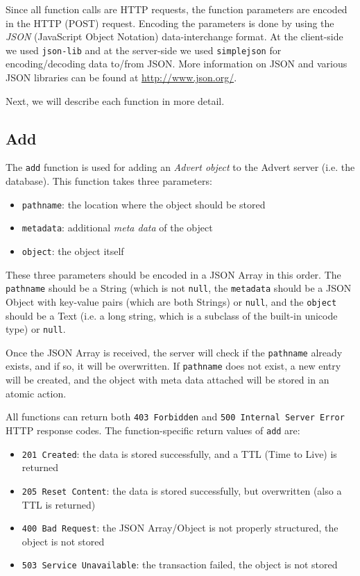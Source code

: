 \documentclass[a4paper,10pt]{article}
\begin{document}
Since all function calls are HTTP requests, the function parameters are encoded
in the HTTP (POST) request. Encoding the parameters is done by using the
\emph{JSON} (JavaScript Object Notation) data-interchange format. At the
client-side we used \texttt{json-lib} and at the server-side we used
\texttt{simplejson} for encoding/decoding data to/from JSON. More information
on JSON and various JSON libraries can be found at \url{http://www.json.org/}.

Next, we will describe each function in more detail.

\subsection{Add}
\label{add}
The \texttt{add} function is used for adding an \emph{Advert object} to the
Advert server (i.e. the database). This function takes three parameters:

\begin{itemize}
  \item \texttt{pathname}: the location where the object should be stored
  \item \texttt{metadata}: additional \emph{meta data} of the object
  \item \texttt{object}: the object itself
\end{itemize}

These three parameters should be encoded in a JSON Array in this order. The
\texttt{pathname} should be a String (which is not \texttt{null}, the
\texttt{metadata} should be a JSON Object with key-value pairs (which are both
Strings) or \texttt{null}, and the \texttt{object} should be a Text (i.e. a long
string, which is a subclass of the built-in unicode type) or \texttt{null}.

Once the JSON Array is received, the server will check if the \texttt{pathname}
already exists, and if so, it will be overwritten. If \texttt{pathname} does
not exist, a new entry will be created, and the object with meta data attached
will be stored in an atomic action.

All functions can return both \texttt{403 Forbidden} and \texttt{500 Internal
Server Error} HTTP response codes. The function-specific return values of
\texttt{add} are:

\begin{itemize}
  \item \texttt{201 Created}: the data is stored successfully, and a TTL (Time
  to
  Live) is returned
  \item \texttt{205 Reset Content}: the data is stored successfully, but
  overwritten (also a TTL is returned)
  \item \texttt{400 Bad Request}: the JSON Array/Object is not properly
  structured, the object is not stored
  \item \texttt{503 Service Unavailable}: the transaction failed, the object is
  not stored
\end{itemize}
\end{document}
